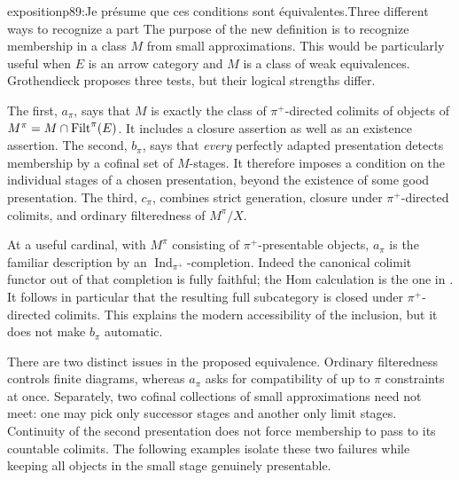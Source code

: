 \begin{dcomment}{exposition}{p89:Je présume que ces conditions sont équivalentes.}{Three different ways to recognize a part}
The purpose of the new definition is to recognize membership in a class $M$ from small approximations. This would be particularly useful when $E$ is an arrow category and $M$ is a class of weak equivalences. Grothendieck proposes three tests, but their logical strengths differ.

The first, $a_\pi$, says that $M$ is exactly the class of $\pi^+$-directed colimits of objects of $M^\pi=M\cap\mathrm{Filt}^\pi(E)$. It includes a closure assertion as well as an existence assertion. The second, $b_\pi$, says that \emph{every} perfectly adapted presentation detects membership by a cofinal set of $M$-stages. It therefore imposes a condition on the individual stages of a chosen presentation, beyond the existence of some good presentation. The third, $c_\pi$, combines strict generation, closure under $\pi^+$-directed colimits, and ordinary filteredness of $M^\pi/X$.

At a useful cardinal, with $M^\pi$ consisting of $\pi^+$-presentable objects, $a_\pi$ is the familiar description by an $\operatorname{Ind}_{\pi^+}$-completion. Indeed the canonical colimit functor out of that completion is fully faithful; the Hom calculation is the one in \citet[I, 9.18(a)]{SGA4I1972}. It follows in particular that the resulting full subcategory is closed under $\pi^+$-directed colimits. This explains the modern accessibility of the inclusion, but it does not make $b_\pi$ automatic.

There are two distinct issues in the proposed equivalence. Ordinary filteredness controls finite diagrams, whereas $a_\pi$ asks for compatibility of up to $\pi$ constraints at once. Separately, two cofinal collections of small approximations need not meet: one may pick only successor stages and another only limit stages. Continuity of the second presentation does not force membership to pass to its countable colimits. The following examples isolate these two failures while keeping all objects in the small stage genuinely presentable.
\end{dcomment}


